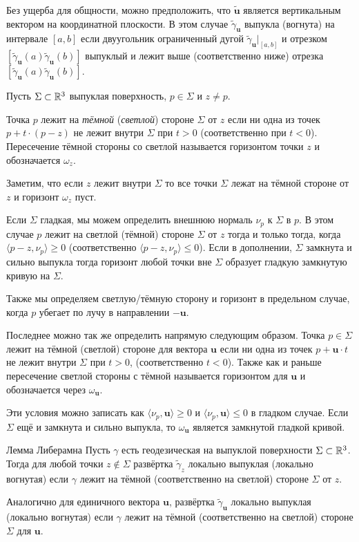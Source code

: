 \documentclass[a4paper,10pt]{article}
\begin{document}
Без ущерба для общности, можно предположить, что $\tilde{\bm{u}}$ является вертикальным вектором на координатной плоскости.
В этом случае $\tilde\gamma_{\bm{u}}$ выпукла (вогнута) на интервале $[a,b]$ 
если двуугольник ограниченный дугой $\tilde\gamma_{\bm{u}}|_{[a,b]}$
и отрезком $[\tilde\gamma_{\bm{u}}(a)\tilde\gamma_{\bm{u}}(b)]$
выпуклый и лежит выше (соответственно ниже) отрезка $[\tilde\gamma_{\bm{u}}(a)\tilde\gamma_{\bm{u}}(b)]$.
 
Пусть $\Sigma\subset\mathbb{R}^3$ выпуклая поверхность,
$p\in\Sigma$ и $z\ne p$.

Точка $p$ лежит на \emph{тёмной}  (\emph{светлой}) стороне $\Sigma$ от $z$ 
если ни одна из точек $p+t\cdot(p-z)$ не лежит внутри  $\Sigma$ при $t>0$ (соответственно при $t<0$).
Пересечение тёмной стороны со светлой называется горизонтом точки $z$ и обозначается $\omega_z$.

Заметим, что если $z$ лежит внутри $\Sigma$ 
то все точки $\Sigma$ лежат на тёмной стороне от $z$ и горизонт $\omega_z$ пуст.

Если $\Sigma$ гладкая, мы можем определить внешнюю нормаль $\nu_p$ к $\Sigma$ в $p$.
В этом случае $p$ лежит на светлой (тёмной) стороне $\Sigma$ от $z$
тогда и только тогда, когда $\langle p-z,\nu_p\rangle\ge 0$
(соответственно $\langle p-z,\nu_p\rangle\le 0$).
Если в дополнении, $\Sigma$ замкнута и сильно выпукла тогда горизонт любой точки вне $\Sigma$
образует гладкую замкнутую кривую на $\Sigma$.

Также мы определяем светлую/тёмную сторону и горизонт в предельном случае,
когда $p$ убегает по лучу в направлении $-\bm{u}$.

Последнее можно так же определить напрямую следующим образом.
Точка $p\in\Sigma$ лежит на тёмной (светлой) стороне для вектора $\bm{u}$ 
если ни одна из точек $p+\bm{u}\cdot t$ не лежит внутри $\Sigma$ при $t>0$, (соответственно $t<0$).
Также как и раньше пересечение светлой стороны с тёмной называется горизонтом для $\bm{u}$ 
и обозначается через $\omega_{\bm{u}}$.

Эти условия можно записать как $\langle \nu_p,\bm{u}\rangle\ge 0$ и $\langle \nu_p,\bm{u}\rangle\le 0$ в гладком случае.
Если $\Sigma$ ещё и замкнута и сильно выпукла, то $\omega_{\bm{u}}$ является замкнутой гладкой кривой.

\begin{thm}{Лемма Либерамна}\label{lem:liberman}
Пусть $\gamma$ есть геодезическая на выпуклой поверхности $\Sigma\subset \mathbb{R}^3$.
Тогда для любой точки $z\notin\Sigma$ развёртка $\tilde\gamma_z$ локально выпуклая (локально вогнутая) если $\gamma$ лежит на тёмной (соответственно на светлой) стороне $\Sigma$ от $z$.

Аналогично для единичного вектора $\bm{u}$,
развёртка $\tilde\gamma_{\bm{u}}$ локально выпуклая (локально вогнутая) если $\gamma$ лежит на тёмной (соответственно на светлой) стороне $\Sigma$ для $\bm{u}$.
\end{thm}
\end{document}
